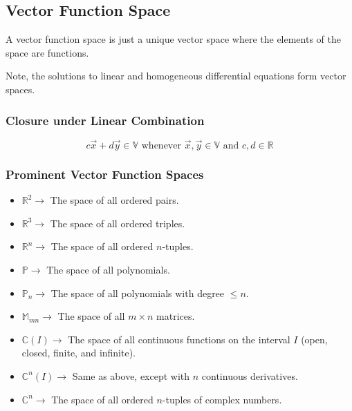     \subsection{Vector Function Space}
    A vector function space is just a unique vector space where the elements of the space are functions.

    Note, the solutions to linear and homogeneous differential equations form vector spaces.

        \subsubsection{Closure under Linear Combination}
        \begin{equation}\label{eq:funcspace_closure}
            c \vec{x} + d \vec{y} \in \mathbb{V} \text{ whenever } \vec{x}, \vec{y} \in \mathbb{V} \text{ and } c, d \in \mathbb{R}
        \end{equation}

        \subsubsection{Prominent Vector Function Spaces}
        \begin{itemize}
            \item $\mathbb{R}^2 \to$ The space of all ordered pairs.
            \item $\mathbb{R}^3 \to$ The space of all ordered triples.
            \item $\mathbb{R}^n \to$ The space of all ordered $n$-tuples.
            \item $\mathbb{P} \to$ The space of all polynomials.
            \item $\mathbb{P}_n \to$ The space of all polynomials with degree $\le n$.
            \item $\mathbb{M}_{mn} \to$ The space of all $m \times n$ matrices.
            \item $\mathbb{C}(I) \to$ The space of all continuous functions on the interval $I$ (open, closed, finite, and infinite).
            \item $\mathbb{C}^n(I) \to$ Same as above, except with $n$ continuous derivatives.
            \item $\mathbb{C}^n \to$ The space of all ordered $n$-tuples of complex numbers.
        \end{itemize}

